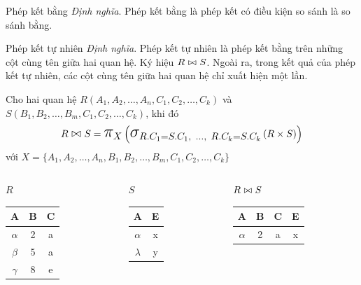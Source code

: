 \documentclass[11pt]{beamer}
\newcommand{\mmm}[1]{\mathlarger{\mathlarger{\mathlarger#1}}}%
\newcommand{\ppi}[2]{\mmm{\pi}_{#1}\left(#2\right)}%
\newcommand{\psig}[2]{\mmm{\sigma}_{#1}\left(#2\right)}%
\begin{document}
  \begin{frame}{Phép kết bằng}
    \textit{Định nghĩa}. Phép kết bằng là phép kết có điều kiện so sánh là so sánh bằng.
  \end{frame}
  \begin{frame}{Phép kết tự nhiên}
    \textit{Định nghĩa}. Phép kết tự nhiên là phép kết bằng trên những cột cùng tên giữa hai quan hệ.
    Ký hiệu $R \join S$. Ngoài ra, trong kết quả của phép kết tự nhiên, các cột cùng tên giữa hai quan hệ
    chỉ xuất hiện một lần.
  \end{frame}
  \begin{frame}
    Cho hai quan hệ $R(A_1, A_2, \dots,A_n, C_1, C_2, \dots, C_k)$ và $S(B_1, B_2, \dots, B_m, C_1, C_2, \dots, C_k)$,
    khi đó
    $$
    R \join S = \ppi{X}{\psig{R.C_1 = S.C_1,\ \dots,\ R.C_k = S.C_k}{R \times S}}
    $$
    với $X = \{A_1, A_2, \dots,A_n, B_1, B_2, \dots, B_m, C_1, C_2, \dots, C_k\}$
  \end{frame}
  \begin{frame}
    \begin{columns}[T]
      \begin{column}{0.3\textwidth}
        \centering $R$
        \medskip \\
        \begin{tabular}{|c|c|c|}
          \hline
          \textbf{A} & \textbf{B} & \textbf{C}  \\[0.5ex] \hline\hline
          $\alpha$ & 2 & a\\ \hline
          $\beta$ & 5 & a\\ \hline
          $\gamma$ & 8 & e\\ \hline
        \end{tabular}
      \end{column}
      \begin{column}{0.3\textwidth}
        \centering $S$
        \medskip \\
        \begin{tabular}{|c|c|}
          \hline
          \textbf{A} & \textbf{E} \\[0.5ex] \hline\hline
          $\alpha$ & x\\ \hline
          $\lambda$ & y\\ \hline
        \end{tabular}
      \end{column}
      \begin{column}{0.3\textwidth}
        \centering $R \join S$
        \medskip \\
        \begin{tabular}{|c|c|c|c|}
          \hline
          \textbf{A} & \textbf{B} & \textbf{C} & \textbf{E}\\[0.5ex] \hline\hline
          $\alpha$ & 2 & a & x \\ \hline
        \end{tabular}
      \end{column}
    \end{columns}
  \end{frame}
\end{document}

